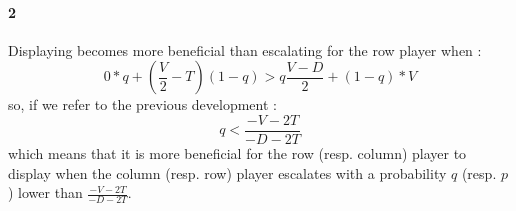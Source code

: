 \documentclass[a4paper]{article}
\begin{document}
\paragraph{2} Displaying becomes more beneficial than escalating for the
row player when : 
$$ 0*q + (\frac{V}{2} - T) (1-q) > q\frac{V-D}{2} + (1-q)*V$$
so, if we refer to the previous development : 
$$ q <  \frac{-V-2T}{-D-2T} $$ 
which means that it is more beneficial for the row (resp. column) player to 
display when the column (resp. row) player escalates with a probability $q$
(resp. $p$) lower than $\frac{-V-2T}{-D-2T}$. 

\end{document}
